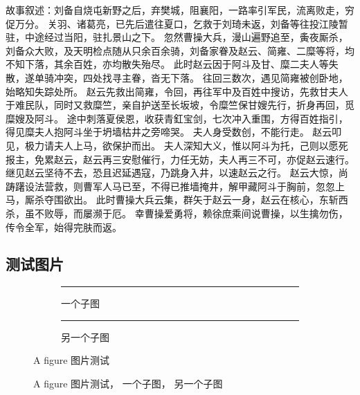 故事叙述：刘备自烧屯新野之后，弃樊城，阻襄阳，一路率引军民，流离败走，穷促万分。
关羽、诸葛亮，已先后遣往夏口，乞救于刘琦未返，刘备等往投江陵暂驻，中途经过当阳，驻扎景山之下。
忽然曹操大兵，漫山遍野追至，夤夜厮杀，刘备众大败，及天明检点随从只余百余骑，刘备家眷及赵云、简雍、二糜等将，均不知下落，其余百姓，亦均散失殆尽。
此时赵云因于阿斗及甘、糜二夫人等失散，遂单骑冲突，四处找寻主眷，沓无下落。
往回三数次，遇见简雍被创卧地，始略知失踪处所。
赵云先救出简雍，令回，再往军中及百姓中搜访，先救甘夫人于难民队，同时又救糜竺，亲自护送至长坂坡，令糜竺保甘嫂先行，折身再回，觅糜嫂及阿斗。
途中刺落夏侯恩，收获青釭宝剑，七次冲入重围，方得百姓指引，得见糜夫人抱阿斗坐于坍墙枯井之旁啼哭。
夫人身受数创，不能行走。
赵云叩见，极力请夫人上马，欲保护而出。
夫人深知大义，惟以阿斗为托，己则以愿死报主，免累赵云，赵云再三安慰催行，力任无妨，夫人再三不可，亦促赵云速行。
继见赵云坚待不去，恐且迟延遇寇，乃跳身入井，以速赵云之行。
赵云大惊，尚踌躇设法营救，则曹军人马已至，不得已推墙掩井，解甲藏阿斗于胸前，忽忽上马，厮杀夺围欲出。
此时曹操大兵云集，群矢于赵云一身，赵云在核心，东斩西杀，虽不败辱，而屡濒于厄。
幸曹操爱勇将，赖徐庶乘间说曹操，以生擒勿伤，传令全军，始得完肤而返。

\subsection{测试图片}

\begin{figure}
    \begin{subfigure}[b]{.5\linewidth}
        \centering
        \rule{2cm}{2cm}
        \caption{一个子图}\label{fig:1a}
    \end{subfigure}%
    \begin{subfigure}[b]{.5\linewidth}
        \centering
        \rule{2cm}{2cm}
        \caption{另一个子图}\label{fig:1b}
    \end{subfigure}
    \caption[A figure 图片测试]{A figure 图片测试\cite{CITATION_ARTICLE}}\label{fig:1}
\end{figure}

\begin{figure}
    \ffigbox[\linewidth]
    {\begin{subfloatrow}\useFCwidth
        \fcapside[\FBwidth]
        {\rule{4cm}{2cm}}
        {\caption{}\label{fig:2a}}
        \fcapside[\FBwidth]
        {\rule{4cm}{2cm}}
        {\caption{}\label{fig:2b}}
    \end{subfloatrow}}
    {
        \caption[A figure 图片测试]{A figure 图片测试\cite{CITATION_ARTICLE}， 一个子图， 另一个子图}
        \label{fig:2}
    }
\end{figure}

